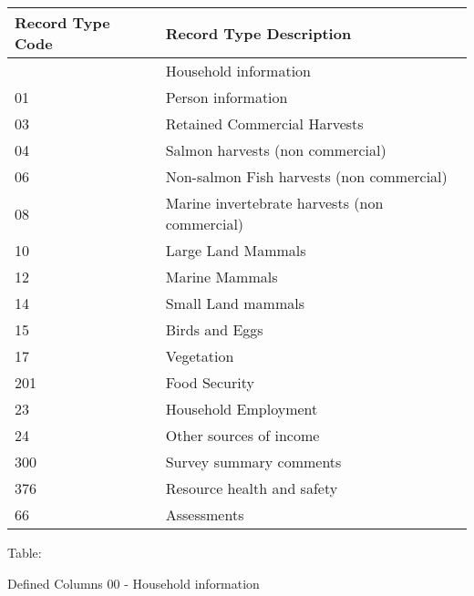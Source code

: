 \documentclass[
]{article}
\begin{document}
\begin{longtable}[]{@{}ll@{}}
\toprule\noalign{}
Record Type Code & Record Type Description \\
\midrule\noalign{}
\endhead
\bottomrule\noalign{}
\endlastfoot
00 & Household information \\
01 & Person information \\
03 & Retained Commercial Harvests \\
04 & Salmon harvests (non commercial) \\
06 & Non-salmon Fish harvests (non commercial) \\
08 & Marine invertebrate harvests (non commercial) \\
10 & Large Land Mammals \\
12 & Marine Mammals \\
14 & Small Land mammals \\
15 & Birds and Eggs \\
17 & Vegetation \\
201 & Food Security \\
23 & Household Employment \\
24 & Other sources of income \\
300 & Survey summary comments \\
376 & Resource health and safety \\
66 & Assessments \\
\end{longtable}

Table:

Defined Columns 00 - Household information
\end{document}
